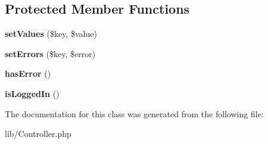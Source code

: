 \subsection*{Protected Member Functions}
\begin{DoxyCompactItemize}
\item 
{\bfseries set\+Values} (\$key, \$value)\hypertarget{class_my_app_1_1_controller_a3b888e7de66b3312578c959b3af94335}{}\label{class_my_app_1_1_controller_a3b888e7de66b3312578c959b3af94335}

\item 
{\bfseries set\+Errors} (\$key, \$error)\hypertarget{class_my_app_1_1_controller_ad26ce27e010db6e3658d3b943b61c589}{}\label{class_my_app_1_1_controller_ad26ce27e010db6e3658d3b943b61c589}

\item 
{\bfseries has\+Error} ()\hypertarget{class_my_app_1_1_controller_a0eb5c57d99ad6b38090a8f3ff2a8071a}{}\label{class_my_app_1_1_controller_a0eb5c57d99ad6b38090a8f3ff2a8071a}

\item 
{\bfseries is\+Logged\+In} ()\hypertarget{class_my_app_1_1_controller_aec09ecacd0354a680655a470f17a4135}{}\label{class_my_app_1_1_controller_aec09ecacd0354a680655a470f17a4135}

\end{DoxyCompactItemize}


The documentation for this class was generated from the following file\+:\begin{DoxyCompactItemize}
\item 
lib/Controller.\+php\end{DoxyCompactItemize}
